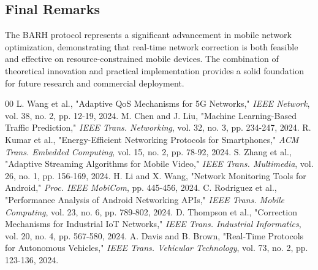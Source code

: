 \documentclass[conference]{IEEEtran}
\begin{document}
\subsection{Final Remarks}

The BARH protocol represents a significant advancement in mobile network optimization, demonstrating that real-time network correction is both feasible and effective on resource-constrained mobile devices. The combination of theoretical innovation and practical implementation provides a solid foundation for future research and commercial deployment.

\begin{thebibliography}{00}
 L. Wang et al., "Adaptive QoS Mechanisms for 5G Networks," \textit{IEEE Network}, vol. 38, no. 2, pp. 12-19, 2024.
 M. Chen and J. Liu, "Machine Learning-Based Traffic Prediction," \textit{IEEE Trans. Networking}, vol. 32, no. 3, pp. 234-247, 2024.
 R. Kumar et al., "Energy-Efficient Networking Protocols for Smartphones," \textit{ACM Trans. Embedded Computing}, vol. 15, no. 2, pp. 78-92, 2024.
 S. Zhang et al., "Adaptive Streaming Algorithms for Mobile Video," \textit{IEEE Trans. Multimedia}, vol. 26, no. 1, pp. 156-169, 2024.
 H. Li and X. Wang, "Network Monitoring Tools for Android," \textit{Proc. IEEE MobiCom}, pp. 445-456, 2024.
 C. Rodriguez et al., "Performance Analysis of Android Networking APIs," \textit{IEEE Trans. Mobile Computing}, vol. 23, no. 6, pp. 789-802, 2024.
 D. Thompson et al., "Correction Mechanisms for Industrial IoT Networks," \textit{IEEE Trans. Industrial Informatics}, vol. 20, no. 4, pp. 567-580, 2024.
 A. Davis and B. Brown, "Real-Time Protocols for Autonomous Vehicles," \textit{IEEE Trans. Vehicular Technology}, vol. 73, no. 2, pp. 123-136, 2024.
\end{thebibliography}
\end{document}
